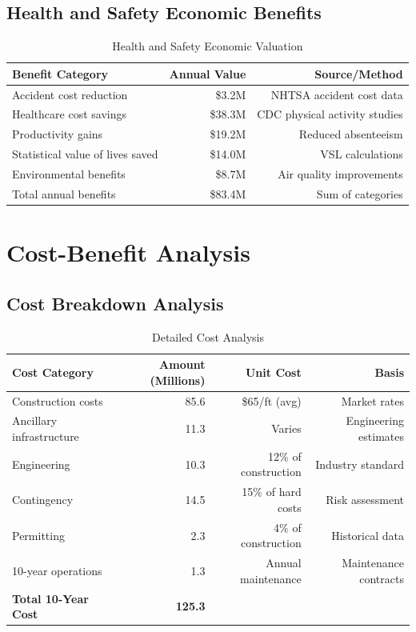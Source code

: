 \documentclass[11pt,letterpaper]{article}
\begin{document}
\subsection{Health and Safety Economic Benefits}

\begin{table}[h]
\centering
\caption{Health and Safety Economic Valuation}
\begin{tabular}{lrr}
\toprule
\textbf{Benefit Category} & \textbf{Annual Value} & \textbf{Source/Method} \\
\midrule
Accident cost reduction & \$3.2M & NHTSA accident cost data \\
Healthcare cost savings & \$38.3M & CDC physical activity studies \\
Productivity gains & \$19.2M & Reduced absenteeism \\
Statistical value of lives saved & \$14.0M & VSL calculations \\
Environmental benefits & \$8.7M & Air quality improvements \\
Total annual benefits & \$83.4M & Sum of categories \\
\bottomrule
\end{tabular}
\end{table}

\section{Cost-Benefit Analysis}

\subsection{Cost Breakdown Analysis}

\begin{table}[h]
\centering
\caption{Detailed Cost Analysis}
\begin{tabular}{lrrr}
\toprule
\textbf{Cost Category} & \textbf{Amount (Millions)} & \textbf{Unit Cost} & \textbf{Basis} \\
\midrule
Construction costs & 85.6 & \$65/ft (avg) & Market rates \\
Ancillary infrastructure & 11.3 & Varies & Engineering estimates \\
Engineering & 10.3 & 12\% of construction & Industry standard \\
Contingency & 14.5 & 15\% of hard costs & Risk assessment \\
Permitting & 2.3 & 4\% of construction & Historical data \\
10-year operations & 1.3 & Annual maintenance & Maintenance contracts \\
\textbf{Total 10-Year Cost} & \textbf{125.3} & & \\
\bottomrule
\end{tabular}
\end{table}
\end{document}
